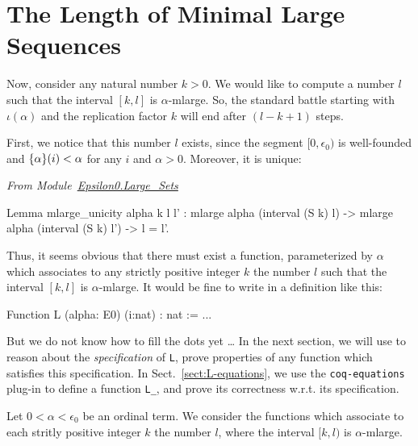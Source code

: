 \section{The Length of Minimal Large Sequences}

Now, consider any natural number $k>0$. We would like to compute
a number $l$ such that the interval $[k,l]$ is $\alpha$-mlarge. So, 
the standard battle starting with $\iota(\alpha)$ and the replication factor $k$ will end after $(l-k+1)$ steps.



First, we notice that this  number $l$ exists, since the segment $[0,\epsilon_0)$ is well-founded and $\mbox{$\{\alpha\}(i)$}<\alpha$ for any $i$ and $\alpha>0$.
Moreover, it is unique:

\vspace{4pt}
\noindent
\emph{From Module~\href{../theories/html/hydras.Epsilon0.Large_Sets.html}{Epsilon0.Large\_Sets}}
\begin{Coqsrc}
Lemma mlarge_unicity alpha k l l' : 
  mlarge alpha (interval (S k) l) ->
  mlarge alpha (interval (S k) l') ->
  l = l'.
\end{Coqsrc}

Thus, it seems obvious that there must exist a function, parameterized by $\alpha$ which associates to any  strictly positive integer $k$ the number $l$ such that
the interval $[k,l]$ is $\alpha$-mlarge. It would be fine to write in \gallina{} a definition like this:

\begin{Coqbad}
Function L (alpha: E0) (i:nat) :  nat := ...
\end{Coqbad}

But we do not know how to fill the dots yet \dots{}   In the next section, we will 
use \coq{} to reason  about the \emph{specification} of \texttt{L},
prove properties of any function which satisfies this specification.
In Sect.~\ref{sect:L-equations}, we use the \texttt{coq-equations} plug-in
to define a function \texttt{L\_}, and prove its correctness w.r.t. its specification.




Let $0<\alpha<\epsilon_0$ be an ordinal term. We consider the functions which associate to each stritly positive integer $k$ the number $l$, where 
the interval $[k,l)$ is $\alpha$-mlarge.


